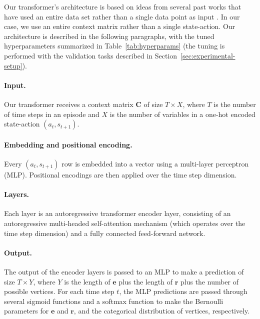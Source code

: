 \documentclass[sigconf]{aamas}
\begin{document}
Our transformer's architecture is based on ideas from several past works that have used an entire data set rather than a single data point as input \cite{kossenSelfAttentionDatapointsGoing2021,goyalRetrievalAugmentedReinforcementLearning2022,keLearningInduceCausal2022,mullerTransformersCanBayesian2022}. In our case, we use an entire context matrix rather than a single state-action. Our architecture is described in the following paragraphs, with the tuned hyperparameters summarized in Table~\ref{tab:hyperparams} (the tuning is performed with the validation tasks described in Section~\ref{sec:experimental-setup}).

\paragraph{Input.} Our transformer receives a context matrix $\mathbf{C}$ of size $T \times X$, where $T$ is the number of time steps in an episode and $X$ is the number of variables in a one-hot encoded state-action $(a_t, s_{t+1})$.

\paragraph{Embedding and positional encoding.} Every $(a_t, s_{t+1})$ row is embedded into a vector using a multi-layer perceptron (MLP). Positional encodings are then applied over the time step dimension.

\paragraph{Layers.} Each layer is an autoregressive transformer encoder layer, consisting of an autoregressive multi-headed self-attention mechanism (which operates over the time step dimension) and a fully connected feed-forward network.

\paragraph{Output.} The output of the encoder layers is passed to an MLP to make a prediction of size $T \times Y$, where $Y$ is the length of $\mathbf{e}$ plus the length of $\mathbf{r}$ plus the number of possible vertices. For each time step $t$, the MLP predictions are passed through several sigmoid functions and a softmax function to make the Bernoulli parameters for $\mathbf{e}$ and $\mathbf{r}$, and the categorical distribution of vertices, respectively.
\end{document}
